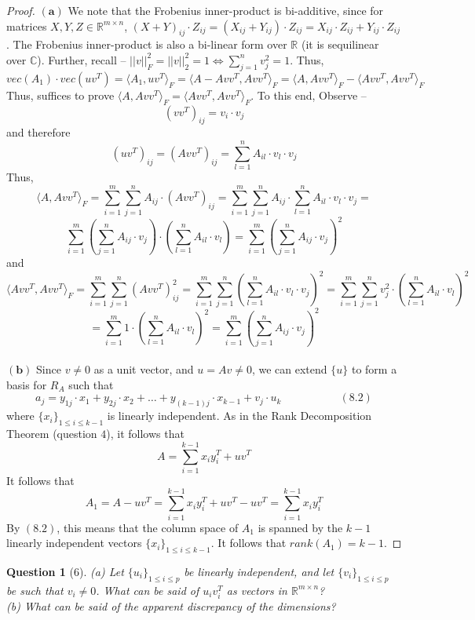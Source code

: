 \documentclass[11pt]{article}
\theoremstyle{quest}
\newtheorem*{question}{Question}
\begin{document}
\begin{proof}
$\mathbf{(a)}$ We note that the Frobenius inner-product is bi-additive, since for matrices $X, Y, Z \in \mathbb{R}^{m \times n}$, $(X+Y)_{ij} \cdot Z_{ij} = (X_{ij} + Y_{ij}) \cdot Z_{ij} = X_{ij} \cdot Z_{ij} + Y_{ij} \cdot Z_{ij}$. The Frobenius inner-product is also a bi-linear form over $\mathbb{R}$ (it is sequilinear over $\mathbb{C}$). Further, recall -- $||v||_F^2 = ||v||_2^2 = 1 \iff \sum_{j=1}^n v_j^2 = 1$. Thus,
$$vec(A_1) \cdot vec(uv^T) = \langle A_1, uv^T \rangle_F = \langle A - Avv^T, Avv^T \rangle_F = \langle A, Avv^T \rangle_F - \langle Avv^T, Avv^T \rangle_F$$
Thus, suffices to prove $ \langle A, Avv^T \rangle_F = \langle Avv^T, Avv^T \rangle_F$. To this end, Observe --
$$(vv^T)_{ij} = v_i \cdot v_j$$
and therefore
$$(uv^T)_{ij} = (Avv^T)_{ij} = \sum_{l=1}^n A_{il} \cdot v_l \cdot v_j$$
Thus,
$$\langle A, Avv^T \rangle_F = \sum_{i =1}^m \sum_{j=1}^n A_{ij} \cdot (Avv^T)_{ij} = \sum_{i =1}^m \sum_{j=1}^n A_{ij} \cdot \sum_{l=1}^n A_{il} \cdot v_l \cdot v_j =$$ $$\sum_{i =1}^m (\sum_{j=1}^n A_{ij} \cdot v_j) \cdot (\sum_{l=1}^n A_{il} \cdot v_l) = \sum_{i =1}^m (\sum_{j=1}^n A_{ij} \cdot v_j)^2$$
and
$$\langle Avv^T, Avv^T \rangle_F = \sum_{i =1}^m \sum_{j =1}^n (Avv^T)_{ij}^2 = \sum_{i =1}^m \sum_{j =1}^n (\sum_{l=1}^n A_{il} \cdot v_l \cdot v_j)^2 = \sum_{i =1}^m \sum_{j =1}^n v_j^2 \cdot (\sum_{l=1}^n A_{il} \cdot v_l)^2$$
$$= \sum_{i =1}^m 1 \cdot (\sum_{l=1}^n A_{il} \cdot v_l)^2 = \sum_{i =1}^m (\sum_{j=1}^n A_{ij} \cdot v_j)^2$$
\\$\mathbf{(b)}$ Since $v \ne 0$ as a unit vector, and $u = Av \ne 0$, we can extend $\{u\}$ to form a basis for $R_A$ such that
$$a_j = y_{1j} \cdot x_1 + y_{2j} \cdot x_2 + \ldots + y_{(k-1)j} \cdot x_{k-1} + v_j \cdot u_k\ \ \ \ \ \ \ \ \ \ \ \ \ \ \ \ \ \ \ \ \ \ \ \ (8.2)$$
where $\{x_i\}_{1 \le i \le k-1}$ is linearly independent. As in the Rank Decomposition Theorem (question $4$), it follows that
$$A = \sum_{i=1}^{k-1} x_i y_i^T + uv^T$$
It follows that
$$A_1 = A - uv^T = \sum_{i=1}^{k-1} x_i y_i^T + uv^T - uv^T = \sum_{i=1}^{k-1} x_i y_i^T$$
By $(8.2)$, this means that the column space of $A_1$ is spanned by the $k-1$ linearly independent vectors $\{x_i\}_{1 \le i \le k-1}$. It follows that $rank(A_1) = k-1$.
\end{proof}
\begin{question}[6]
(a) Let $\{u_i\}_{1 \le i \le p}$ be linearly independent, and let $\{v_i\}_{1 \le i \le p}$ be such that $v_i \ne 0$. What can be said of $u_iv_i^T$ as vectors in $\mathbb{R}^{m \times n}$?
\\(b) What can be said of the apparent discrepancy of the dimensions?
\end{question}
\end{document}

